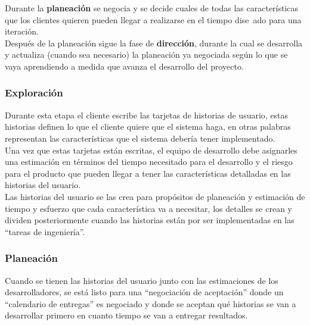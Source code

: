         Durante la \textbf{planeación} se negocia y se decide cuales de todas las características que los clientes quieren pueden llegar a realizarse en el tiempo dise~ado para una iteración.\\

        Después de la planeación sigue la fase de \textbf{dirección}, durante la cual se desarrolla y actualiza (cuando sea necesario) la planeación ya negociada según lo que se vaya aprendiendo a medida que avanza el desarrollo del proyecto.\\

          \subsubsection{Exploración}
          \label{subs:exploracion}
            Durante esta etapa el cliente escribe las tarjetas de historias de usuario, estas historias definen lo que el cliente quiere que el sistema haga, en otras palabras representan las características que el sistema debería tener implementado.\\

            Una vez que estas tarjetas están escritas, el equipo de desarrollo debe asignarles una estimación en términos del tiempo necesitado para el desarrollo y el riesgo para el producto que pueden llegar a tener las características detalladas en las historias del usuario.\\

            Las historias del usuario se las crea para propósitos de planeación y estimación de tiempo y esfuerzo que cada característica va a necesitar, los detalles se crean y dividen posteriormente cuando las historias están por ser implementadas en las “tareas de ingeniería”.\\

          \subsubsection{Planeación}
          \label{subs:planeacion}

            Cuando se tienen las historias del usuario junto con las estimaciones de los desarrolladores, se está listo para una “negociación de aceptación” donde un “calendario de entregas”  es negociado y donde se aceptan qué historias se van a desarrollar primero en cuanto tiempo se van a entregar resultados.\\


